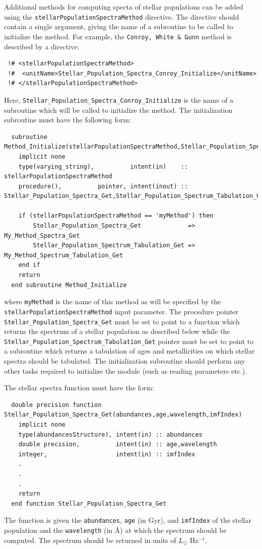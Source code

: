 Additional methods for computing specta of stellar populations can be added using the {\tt stellarPopulationSpectraMethod} directive. The directive should contain a single argument, giving the name of a subroutine to be called to initialize the method. For example, the {\tt Conroy, White \& Gunn} method is described by a directive:
\begin{verbatim}
 !# <stellarPopulationSpectraMethod>
 !#  <unitName>Stellar_Population_Spectra_Conroy_Initialize</unitName>
 !# </stellarPopulationSpectraMethod>
\end{verbatim}
Here, {\tt Stellar\_Population\_Spectra\_Conroy\_Initialize} is the name of a subroutine which will be called to initialize the method. The initialization subroutine must have the following form:
\begin{verbatim}
  subroutine Method_Initialize(stellarPopulationSpectraMethod,Stellar_Population_Spectra_Get,Stellar_Population_Spectrum_Tabulation_Get)
    implicit none
    type(varying_string),          intent(in)    :: stellarPopulationSpectraMethod
    procedure(),          pointer, intent(inout) :: Stellar_Population_Spectra_Get,Stellar_Population_Spectrum_Tabulation_Get
    
    if (stellarPopulationSpectraMethod == 'myMethod') then
        Stellar_Population_Spectra_Get             => My_Method_Spectra_Get
        Stellar_Population_Spectrum_Tabulation_Get => My_Method_Spectrum_Tabulation_Get
    end if
    return
  end subroutine Method_Initialize
\end{verbatim}
where {\tt myMethod} is the name of this method as will be specified by the {\tt stellarPopulationSpectraMethod} input parameter. The procedure pointer {\tt Stellar\_Population\_Spectra\_Get} must be set to point to a function which returns the spectrum of a stellar population as described below while the {\tt Stellar\_Population\_Spectrum\_Tabulation\_Get} pointer must be set to point to a subroutine which returns a tabulation of ages and metallicities on which stellar spectra should be tabulated. The initialization subroutine should perform any other tasks required to initialize the module (such as reading parameters etc.).

The stellar spectra function must have the form:
\begin{verbatim}
  double precision function Stellar_Population_Spectra_Get(abundances,age,wavelength,imfIndex)
    implicit none
    type(abundancesStructure), intent(in) :: abundances
    double precision,          intent(in) :: age,wavelength
    integer,                   intent(in) :: imfIndex
    .
    .
    .
    return
  end function Stellar_Population_Spectra_Get
\end{verbatim}
The function is given the {\tt abundances}, {\tt age} (in Gyr), and {\tt imfIndex} of the stellar population and the {\tt wavelength} (in \AA) at which the spectrum should be computed. The spectrum should be returned in units of $L_\odot$ Hz$^{-1}$.

